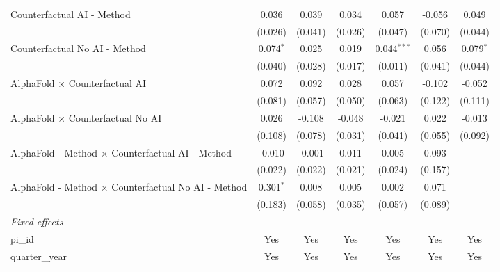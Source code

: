 \begin{tabular}{lcccccc}
   Counterfactual AI - Method                                 & 0.036       & 0.039        & 0.034        & 0.057         & -0.056      & 0.049\\   
                                                              & (0.026)     & (0.041)      & (0.026)      & (0.047)       & (0.070)     & (0.044)\\   
   Counterfactual No AI - Method                              & 0.074$^{*}$ & 0.025        & 0.019        & 0.044$^{***}$ & 0.056       & 0.079$^{*}$\\   
                                                              & (0.040)     & (0.028)      & (0.017)      & (0.011)       & (0.041)     & (0.044)\\   
   AlphaFold $\times$ Counterfactual AI                       & 0.072       & 0.092        & 0.028        & 0.057         & -0.102      & -0.052\\   
                                                              & (0.081)     & (0.057)      & (0.050)      & (0.063)       & (0.122)     & (0.111)\\   
   AlphaFold $\times$ Counterfactual No AI                    & 0.026       & -0.108       & -0.048       & -0.021        & 0.022       & -0.013\\   
                                                              & (0.108)     & (0.078)      & (0.031)      & (0.041)       & (0.055)     & (0.092)\\   
   AlphaFold - Method $\times$ Counterfactual AI - Method     & -0.010      & -0.001       & 0.011        & 0.005         & 0.093       &   \\   
                                                              & (0.022)     & (0.022)      & (0.021)      & (0.024)       & (0.157)     &   \\   
   AlphaFold - Method $\times$ Counterfactual No AI - Method  & 0.301$^{*}$ & 0.008        & 0.005        & 0.002         & 0.071       &   \\   
                                                              & (0.183)     & (0.058)      & (0.035)      & (0.057)       & (0.089)     &   \\   
   \midrule
   \emph{Fixed-effects}\\
   pi\_id                                                     & Yes         & Yes          & Yes          & Yes           & Yes         & Yes\\  
   quarter\_year                                              & Yes         & Yes          & Yes          & Yes           & Yes         & Yes\\  

\end{tabular}
